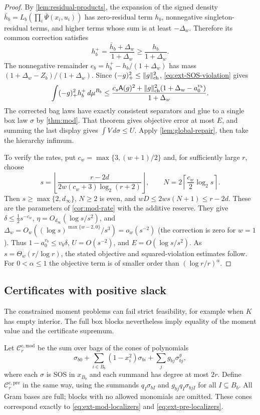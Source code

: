 \begin{proof}
By \cref{lem:residual-products}, the expansion of the signed density
$\bar h_b=L_b(\prod_i\bar\Psi(x_i,u_i))$ has zero-residual term $h_b$,
nonnegative singleton-residual terms, and higher terms whose sum is at
least $-\Delta_w$. Therefore its common correction satisfies
\[
 h_b^+=\frac{\bar h_b+\Delta_w}{1+\Delta_w}
 \ge\frac{h_b}{1+\Delta_w}.
\]
The nonnegative remainder
$e_b=h_b^+-h_b/(1+\Delta_w)$ has mass
$(1+\Delta_w-Z_b)/(1+\Delta_w)$. Since
$(-g)_+^2\le\lVert g\rVert_{\mathrm{ch}}^2$, \eqref{eq:ext-SOS-violation} gives
\[
 \int(-g)_+^2h_b^+\,d\mu^{B_b}
 \le\frac{c_s\mathsf{A}(g)^2+\lVert g\rVert_{\mathrm{ch}}^2(1+\Delta_w-a_0^{v_b})}
 {1+\Delta_w}.
\]
The corrected bag laws
have exactly consistent separators and glue to a single box law
$\sigma$ by \cref{thm:mod}. That theorem gives objective error at most
$E$, and summing the last display gives $\int V\,d\sigma\le U$.
Apply \cref{lem:global-repair}, then take the hierarchy infimum.

To verify the rates, put $c_w=\max\{3,(w+1)/2\}$ and, for sufficiently
large $r$, choose
\[
 s=\left\lfloor\frac{r-2d}{2w(c_w+3)\log_2(r+2)}\right\rfloor,
 \qquad N=2\left\lceil\frac{c_w}{2}\log_2s\right\rceil.
\]
Then $s\ge\max\{2,d_\infty\}$, $N\ge2$ is even, and
$wD\le2ws(N+1)\le r-2d$. These are the parameters of
\cref{cor:mod-rate} with the additive reserve. They give
$\delta\le\tfrac12s^{-c_w}$,
$\eta=O_{d_\infty}(\log s/s^2)$, and
$\Delta_w=O_w((\log s)^{\max\{w-2,0\}}/s^3)=o_w(s^{-2})$
(the correction is zero for $w=1$). Thus
$1-a_0^{v_b}\le v_b\delta$, $U=O(s^{-2})$, and
$E=O(\log s/s^2)$. As $s=\Theta_w(r/\log r)$, the stated objective and
squared-violation estimates follow. For $0<\alpha\le1$ the objective
term is of smaller order than $(\log r/r)^\alpha$.
\end{proof}

\subsection{Certificates with positive slack}\label{sec:ext-certificates}

The constrained moment problems can fail strict feasibility, for example
when $K$ has empty interior. The full box blocks nevertheless imply equality
of the moment value and the certificate supremum.

Let $\mathcal C_r^{\mathrm{c,mod}}$ be the sum over bags of the cones of
polynomials
\[
 \sigma_{b0}+\sum_{i\in B_b}(1-x_i^2)\sigma_{bi}
       +\sum_jg_{bj}\sigma^g_{bj},
\]
where each $\sigma$ is SOS in $x_{B_b}$ and each summand has degree at most
$2r$.
Define $\mathcal C_r^{\mathrm{c,pre}}$ in the same way, using the summands
$q_I\sigma_{bI}$ and $g_{bj}q_I\sigma_{bjI}$ for all $I\subseteq B_b$.
All Gram bases are full; blocks with no allowed monomials are omitted.
These cones correspond exactly to
\eqref{eq:ext-mod-localizers} and \eqref{eq:ext-pre-localizers}.

